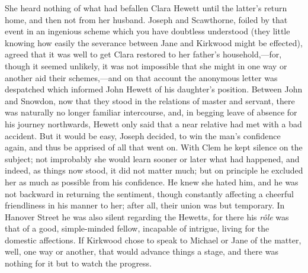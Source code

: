 She heard nothing of what had befallen Clara Hewett until the latter's
return home, and then not from her husband. Joseph and Scawthorne,
foiled by that event in an ingenious scheme which you have doubtless
understood (they little knowing how easily the severance between Jane
and Kirkwood might be effected), agreed that it was well to get Clara
restored to her father's household,---for, though it seemed unlikely, it
was not impossible that she might in one way or another aid their
schemes,---and on that account the anonymous letter was despatched which
informed John Hewett of his daughter's position. Between John and
Snowdon, now that they stood in the relations of master and servant,
there was naturally no longer familiar intercourse, and, in begging
leave of absence for his journey northwards, Hewett only said that a
near relative had met with a bad accident. But it would be easy, Joseph
decided, to win the man's confidence again, and thus be apprised of all
that went on. With Clem he {}kept silence on the subject; not improbably
she would learn sooner or later what had happened, and indeed, as things
now stood, it did not matter much; but on principle he excluded her as
much as possible from his confidence. He knew she hated him, and he was
not backward in returning the sentiment, though constantly affecting a
cheerful friendliness in his manner to her; after all, their union was
but temporary. In Hanover Street he was also silent regarding the
Hewetts, for there his \emph{rôle} was that of a good, simple-minded
fellow, incapable of intrigue, living for the domestic affections. If
Kirkwood chose to speak to Michael or Jane of the matter, well, one way
or another, that would advance things a stage, and there was nothing for
it but to watch the progress.

